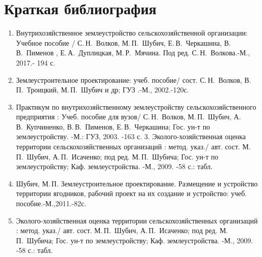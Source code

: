 ﻿\section{Краткая библиография}


\begin{enumerate}
	\item Внутрихозяйственное землеустройство сельскохозяйственной организации: Учебное пособие / С.\,Н.~Волков, М.\,П.~Шубич, Е.\,В.~Черкашина, В.\,В.~Пименов , Е.\,А.~Дуплицкая, М.\,Р.~Мячина. Под ред. С.\,Н.~Волкова.-М., 2017.- 194 с.
	\item Землеустроительное проектирование: учеб. пособие/ сост. С.\,Н.~Волков, В.\,П.~Троицкий, М.\,П.~Шубич и др; ГУЗ .-М., 2002.-120с.
	\item Практикум по внутрихозяйственному землеустройству сельскохозяйственного предприятия : Учеб. пособие для вузов/ С.\,Н.~Волков, М.\,П.~Шубич, А.\,В.~Купчиненко, В.\,В.~Пименов, Е.\,В.~Черкашина; Гос. ун-т по землеустройству. -М.: ГУЗ, 2003. -163 с.
3.	Эколого-хозяйственная оценка территории сельскохозяйственных организаций : метод. указ./ авт. сост. М.\,П.~Шубич, А.\,П.~Исаченко; под ред. М.\,П.~Шубича; Гос. ун-т по землеустройству; Каф. землеустройства. -М., 2009. -58 с.: табл.
	\item Шубич, М.\,П. Землеустроительное проектирование. Размещение и устройство территории ягодников, рабочий проект на их создание и устройство: учеб. пособие.-М.,2011.-82с.
	\item Эколого-хозяйственная оценка территории сельскохозяйственных организаций : метод. указ./ авт. сост. М.\,П.~Шубич, А.\,П.~Исаченко; под ред. М.\,П.~Шубича; Гос. ун-т по землеустройству; Каф. землеустройства. -М., 2009. -58 с.: табл.
\end{enumerate}